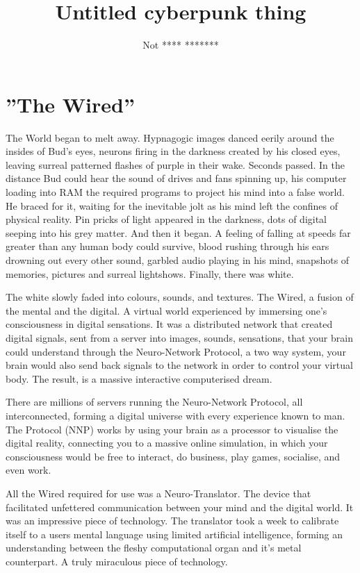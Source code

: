 \documentclass{book}
\title{Untitled cyberpunk thing}
\author{Not **** *******}
\begin{document}
\maketitle
\chapter{''The Wired''}

The World began to melt away. Hypnagogic images danced eerily around the insides of Bud's eyes, neurons firing in the darkness created by his closed eyes, leaving surreal patterned flashes of purple in their wake. Seconds passed. In the distance Bud could hear the sound of drives and fans spinning up, his computer loading into RAM the required programs to project his mind into a false world. He braced for it, waiting for the inevitable jolt as his mind left the confines of physical reality. Pin pricks of light appeared in the darkness, dots of digital seeping into his grey matter. And then it began. A feeling of falling at speeds far greater than any human body could survive, blood rushing through his ears drowning out every other sound, garbled audio playing in his mind, snapshots of memories, pictures and surreal lightshows. Finally, there was white.

The white slowly faded into colours, sounds, and textures. The Wired, a fusion of the mental and the digital. A virtual world experienced by immersing one's consciousness in digital sensations. It was a distributed network that created digital signals, sent from a server into images, sounds, sensations, that your brain could understand through the Neuro-Network Protocol, a two way system, your brain would also send back signals to the network in order to control your virtual body. The result, is a massive interactive computerised dream.

There are millions of servers running the Neuro-Network Protocol, all interconnected, forming a digital universe with every experience known to man. The Protocol (NNP) works by using your brain as a processor to visualise the digital reality, connecting you to a massive online simulation, in which your consciousness would be free to interact, do business, play games, socialise, and even work.

All the Wired required for use was a Neuro-Translator. The device that facilitated unfettered communication between your mind and the digital world. It was an impressive piece of technology. The translator took a week to calibrate itself to a users mental language using limited artificial intelligence, forming an understanding between the fleshy computational organ and it's metal counterpart. A truly miraculous piece of technology.
\end{document}
